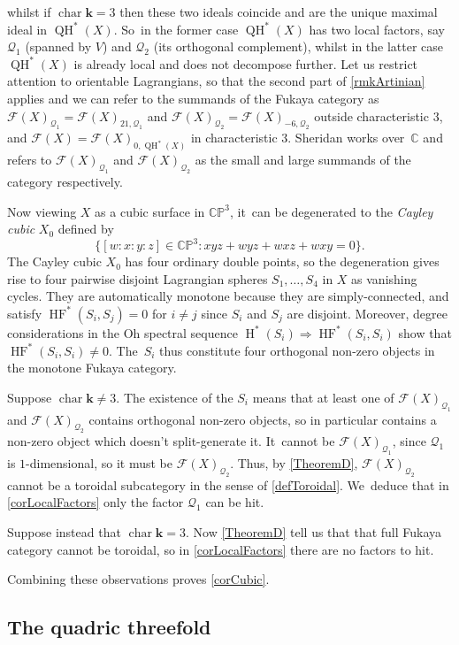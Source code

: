 \documentclass[JEP,XML,SOM,Unicode,NoEqCountersInSection,NoFloatCountersInSection,published]{cedram}
\theoremstyle{definition}
\newcommand{\CC}{\mathbb{C}}
\newcommand{\PP}{\mathbb{P}}
\newcommand{\calQ}{\mathcal{Q}}
\newcommand{\Fuk}{\mathcal{F}}
\newcommand{\kk}{{\boldsymbol{k}}}
\newcommand{\Char}{\operatorname{char}}
\newcommand{\rH}{\operatorname{H}}
\newcommand{\HF}{\operatorname{HF}}
\newcommand{\QH}{\operatorname{QH}}
\begin{document}
whilst if $\Char \kk = 3$ then these two ideals coincide and are the unique maximal ideal in $\QH^*(X)$. So~in the former case $\QH^*(X)$ has two local factors, say $\calQ_1$ (spanned by $V$) and $\calQ_2$ (its orthogonal complement), whilst in the latter case $\QH^*(X)$ is already local and does not decompose further. Let us restrict attention to orientable Lagrangians, so that the second part of \cref{rmkArtinian} applies and we can refer to the summands of the Fukaya category as $\Fuk(X)_{\calQ_1} = \Fuk(X)_{21, \calQ_1}$ and $\Fuk(X)_{\calQ_2} = \Fuk(X)_{-6, \calQ_2}$ outside characteristic $3$, and $\Fuk(X) = \Fuk(X)_{0, \QH^*(X)}$ in characteristic $3$. Sheridan works over~$\CC$ and refers to $\Fuk(X)_{\calQ_1}$ and $\Fuk(X)_{\calQ_2}$ as the small and large summands of the category respectively.

Now viewing $X$ as a cubic surface in $\CC\PP^3$, it~can be degenerated to the \emph{Cayley cubic} $X_0$ defined by
\[
\{[w:x:y:z] \in \CC\PP^3 : xyz+ wyz + wxz + wxy = 0\}.
\]
The Cayley cubic $X_0$ has four ordinary double points, so the degeneration gives rise to four pairwise disjoint Lagrangian spheres $S_1, \dots, S_4$ in $X$ as vanishing cycles. They are automatically monotone because they are simply-connected, and satisfy $\HF^*(S_i, S_j) = 0$ for $i \neq j$ since $S_i$ and $S_j$ are disjoint. Moreover, degree considerations in the Oh spectral sequence $\rH^*(S_i) \Rightarrow \HF^*(S_i, S_i)$ show that $\HF^*(S_i, S_i) \neq 0$. The~$S_i$ thus constitute four orthogonal non-zero objects in the monotone Fukaya category.

Suppose $\Char \kk \neq 3$. The existence of the $S_i$ means that at least one of $\Fuk(X)_{\calQ_1}$ and $\Fuk(X)_{\calQ_2}$ contains orthogonal non-zero objects, so in particular contains a non-zero object which doesn't split-generate it. It~cannot be $\Fuk(X)_{\calQ_1}$, since $\calQ_1$ is $1$-dimensional, so it must be $\Fuk(X)_{\calQ_2}$. Thus, by \cref{TheoremD}, $\Fuk(X)_{\calQ_2}$ cannot be a toroidal subcategory in the sense of \cref{defToroidal}. We~deduce that in \cref{corLocalFactors} only the factor $\calQ_1$ can be hit.

Suppose instead that $\Char \kk = 3$. Now \cref{TheoremD} tell us that that full Fukaya category cannot be toroidal, so in \cref{corLocalFactors} there are no factors to hit.

Combining these observations proves \cref{corCubic}.

\subsection{The quadric threefold}
\label{exQuadric}
\end{document}

